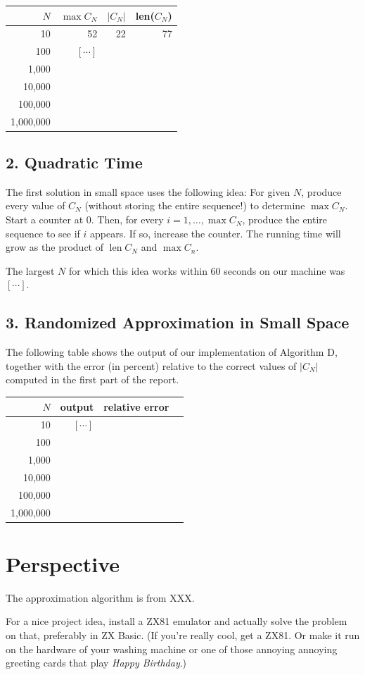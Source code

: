\documentclass{tufte-handout}
\begin{document}
\medskip
\begin{tabular}{rrrr}
  \toprule
  $N$ & $\max C_N$ & $|C_N|$ & len($C_N$) \\
  \midrule
  10 & 52 & 22 & 77 
  \\
  100 & $[\cdots]$ \\
  1,000 & \\
  10,000 & \\
  100,000 & \\
  1,000,000 & \\
  \bottomrule
\end{tabular}


\subsection{2. Quadratic Time}

The first solution in small space uses the following idea: For given
$N$, produce every value of $C_N$ (without storing the entire
sequence!)
to determine $\max C_N$.
Start a counter at 0.
Then, for every $i=1,\ldots, \max C_N$, produce the entire sequence to
see if $i$ appears.
If so, increase the counter.
The running time will grow as the product of $\operatorname{len}C_N$ and $ \max C_n$.

The largest $N$ for which this idea works within 60 seconds on our
machine was $[\cdots]$.


\subsection{3. Randomized Approximation in Small Space}

The following table shows the output of our implementation of
Algorithm D, together with the error (in percent) relative to the
correct values of $|C_N|$ computed in the first part of the report.

\medskip
\begin{tabular}{rrrr}
  \toprule
  $N$ &   output & relative error \\
  \midrule
  10 & $[\cdots]$ &
  \\
  100 & \\
  1,000 & \\
  10,000 & \\
  100,000 & \\
  1,000,000 & \\
  \bottomrule
\end{tabular}


\newpage
\section{Perspective}

The approximation algorithm is from XXX.

For a nice project idea, install a ZX81 emulator and actually solve
the problem on that, preferably in ZX Basic.
(If you're really cool, get a ZX81.
Or make it run on the hardware of your washing machine or one of those
annoying annoying greeting cards that play \emph{Happy Birthday}.)
\end{document}
